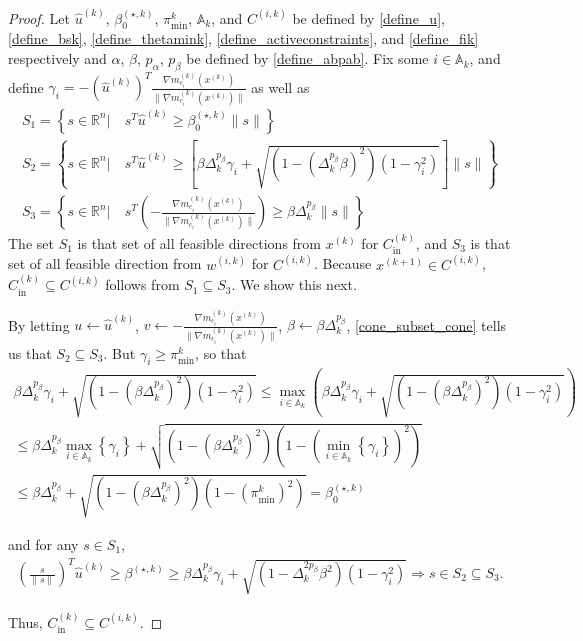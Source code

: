 \documentclass{article}
\theoremstyle{case}
\numberwithin{theorem}{subsection}
\newcommand{\activeconstraintsk}{{\mathbb A_{k}}}
\newcommand{\bs}{{\beta^{(\star, k)}}}
\newcommand{\bsk}{{\beta_0^{(\star, k)}}}
\newcommand{\dk}{\Delta_k}
\newcommand{\fcki}{{C^{(k)}_{\textrm{in}}}}
\newcommand{\gmcik}{{\nabla m_{c_i}^{(k)}\left(\xk\right)}}
\newcommand{\hgik}{{\frac{\nabla m^{(k)}_{c_i}(\xk)}{\|\nabla m^{(k)}_{c_i}\left(\xk\right)\|}}}
\newcommand{\huk}{{{\hat u}^{(k)}}}
\newcommand{\Rn}{\mathbb R^n}
\newcommand{\thetamink}{{\pi^k_{\textrm{min}}}}
\newcommand{\wik}{{w^{(i, k)}}}
\newcommand{\xkpo}{{{x}^{(k+1)}}}
\newcommand{\xk}{x^{(k)}}
\newcommand{\fik}{{C^{(i, k)}}}
\begin{document}
\begin{proof}
Let 
$\huk$, $\bsk$, $\thetamink$, $\activeconstraintsk$, and $\fik$
be defined by
\cref{define_u}, \cref{define_bsk}, \cref{define_thetamink}, \cref{define_activeconstraints}, and \cref{define_fik} 
respectively and $\alpha$, $\beta$, $p_{\alpha}$, $p_{\beta}$ be defined by \cref{define_abpab}.
Fix some $i \in \activeconstraintsk$, and define $\gamma_i = -\left(\huk\right)^T\hgik$ as well as
\begin{align*}
S_1 = \left\{s\in\Rn | \quad s^T\huk\ge\bsk\|s\| \right\} \\
S_2 = \left\{s\in\Rn | \quad s^T\huk\ge\left[\beta\dk^{p_{\beta}}\gamma_i + \sqrt{(1 - \left(\dk^{p_{\beta}}\beta\right)^2)\left(1 - \gamma_i^2\right)}\right]\|s\| \right\} \\
S_3 = \left\{s\in\Rn | \quad s^T\left(-\hgik\right)\ge\beta\dk^{p_{\beta}}\|s\| \right\}
\end{align*}
The set $S_1$ is that set of all feasible directions from $\xk$ for $\fcki$, and $S_3$ is that set of all feasible direction from $\wik$ for $\fik$.
Because $\xkpo \in \fik$, $\fcki \subseteq \fik$ follows from $S_1 \subseteq S_3$.
We show this next.


By letting $u \gets \huk$, $v \gets -\hgik$, $\beta \gets \beta \dk^{p_{\beta}}$, \cref{cone_subset_cone} tells us that
$S_2 \subseteq S_3$.
But $\gamma_i \ge \thetamink$, so that
\begin{align*}
\beta\dk^{p_{\beta}}\gamma_i + \sqrt{\left(1 - \left(\beta\dk^{p_{\beta}}\right)^2\right)\left(1 - \gamma_i^2\right)}
\le \max_{i\in\activeconstraintsk} \left(\beta\dk^{p_{\beta}}\gamma_i + \sqrt{\left(1 - \left(\beta\dk^{p_{\beta}}\right)^2\right)\left(1 - \gamma_i^2\right)}\right) \\
\le \beta\dk^{p_{\beta}} \max_{i\in\activeconstraintsk}\left\{\gamma_i\right\} + \sqrt{\left(1 - \left(\beta\dk^{p_{\beta}}\right)^2\right)\left(1 - \left(\min_{i\in\activeconstraintsk}\left\{\gamma_i\right\}\right)^2\right)} \\
\le \beta\dk^{p_{\beta}} + \sqrt{\left(1 - \left(\beta\dk^{p_{\beta}}\right)^2\right)\left(1 - \left(\thetamink\right)^2\right)} = \bsk
\end{align*}

and for any $s\in S_1$,
\begin{align*}
\left(\frac{s}{\|s\|}\right)^T\huk \ge \bs 
\ge \beta\dk^{p_{\beta}}\gamma_i + \sqrt{(1 - \dk^{2p_{\beta}}\beta^2)\left(1 - \gamma_i^2\right)}
\Longrightarrow s \in S_2 \subseteq S_3.
\end{align*}

Thus, $\fcki \subseteq \fik$.
\end{proof}
\end{document}

